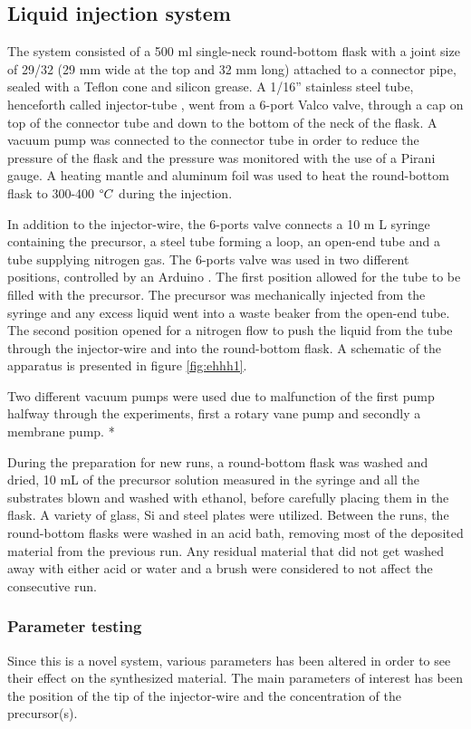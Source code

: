 \documentclass[Main/main.tex]{subfiles}
\begin{document}
\subsection{Liquid injection system}
The system consisted of a 500 ml single-neck round-bottom flask with a joint size of 29/32 (29 mm wide at the top and 32 mm long) attached to a connector pipe, sealed with a Teflon cone  and silicon grease. A 1/16” stainless steel tube, henceforth called injector-tube  , went from a 6-port Valco valve, through a cap on top of the connector tube and down to the bottom of the neck of the flask. A vacuum pump was connected to the connector tube in order to reduce the pressure of the flask and the pressure was monitored with the use of a Pirani gauge. A heating mantle and aluminum foil was used to heat the round-bottom flask to 300-400 $\degree C$ during the injection.

In addition to the injector-wire, the 6-ports valve connects a 10 m L syringe containing the precursor, a steel tube forming a loop, an open-end tube and a tube supplying nitrogen gas. The 6-ports valve was used in two different positions, controlled by an Arduino  . The first position allowed for the tube to be filled with the precursor. The precursor was mechanically injected from the syringe and any excess liquid went into a waste beaker from the open-end tube. The second position opened for a nitrogen flow to push the liquid from the tube through the injector-wire and into the round-bottom flask. A schematic of the apparatus is presented in figure \ref{fig:ehhh1}. 

Two different vacuum pumps were used due to malfunction of the first pump halfway through the experiments, first a rotary vane pump and secondly a membrane pump. *  

During the preparation for new runs, a round-bottom flask was washed and dried, 10 mL of the precursor solution measured in the syringe and all the substrates blown and washed with ethanol, before carefully placing them in the flask. A variety of glass, Si and steel plates were utilized. Between the runs, the round-bottom flasks were washed in an acid bath, removing most of the deposited material from the previous run. Any residual material that did not get washed away with either acid or water and a brush were considered to not affect the consecutive run.


\subsubsection{Parameter testing}
Since this is a novel system, various parameters has been altered in order to see their effect on the synthesized material. The main parameters of interest has been the position of the tip of the injector-wire and the concentration of the precursor(s). 
\end{document}
